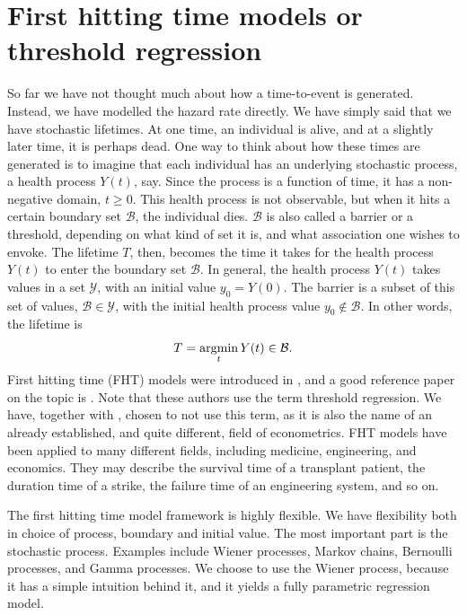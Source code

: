 \section{First hitting time models or threshold regression}
So far we have not thought much about how a time-to-event is generated. Instead, we have modelled the hazard rate directly. We have simply said that we have stochastic lifetimes. At one time, an individual is alive, and at a slightly later time, it is perhaps dead. One way to think about how these times are generated is to imagine that each individual has an underlying stochastic process, a health process $Y(t)$, say. Since the process is a function of time, it has a non-negative domain, $t\geq0$. This health process is not observable, but when it hits a certain boundary set $\mathcal{B}$, the individual dies. $\mathcal{B}$ is also called a barrier or a threshold, depending on what kind of set it is, and what association one wishes to envoke. The lifetime $T$, then, becomes the time it takes for the health process $Y(t)$ to enter the boundary set $\mathcal{B}$. In general, the health process $Y(t)$ takes values in a set $\mathcal{Y}$, with an initial value $y_0=Y(0)$. The barrier is a subset of this set of values, $\mathcal{B}\in\mathcal{Y}$, with the initial health process value $y_0\notin\mathcal{B}$. In other words, the lifetime is
\begin{equation*}
    T=\operatorname*{argmin}_{t}Y(t)\in\mathcal{B}.
\end{equation*}
First hitting time (FHT) models were introduced in \citet{whitmore1986}, and a good reference paper on the topic is \citet{leewhitmore2006}. Note that these authors use the term threshold regression. We have, together with \citet{caroni2017}, chosen to not use this term, as it is also the name of an already established, and quite different, field of econometrics. FHT models have been applied to many different fields, including medicine, engineering, and economics. They may describe the survival time of a transplant patient, the duration time of a strike, the failure time of an engineering system, and so on.

The first hitting time model framework is highly flexible. We have flexibility both in choice of process, boundary and initial value. The most important part is the stochastic process. Examples include Wiener processes, Markov chains, Bernoulli processes, and Gamma processes. We choose to use the Wiener process, because it has a simple intuition behind it, and it yields a fully parametric regression model.

